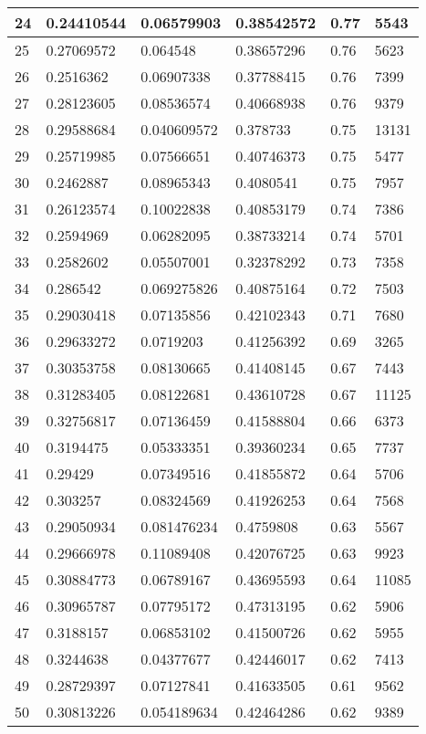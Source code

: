\begin{longtable}{|l|l|l|l|l|l|}
24 & 0.24410544 & 0.06579903 & 0.38542572 & 0.77 & 5543 \\ \hline 
25 & 0.27069572 & 0.064548 & 0.38657296 & 0.76 & 5623 \\ \hline 
26 & 0.2516362 & 0.06907338 & 0.37788415 & 0.76 & 7399 \\ \hline 
27 & 0.28123605 & 0.08536574 & 0.40668938 & 0.76 & 9379 \\ \hline 
28 & 0.29588684 & 0.040609572 & 0.378733 & 0.75 & 13131 \\ \hline 
29 & 0.25719985 & 0.07566651 & 0.40746373 & 0.75 & 5477 \\ \hline 
30 & 0.2462887 & 0.08965343 & 0.4080541 & 0.75 & 7957 \\ \hline 
31 & 0.26123574 & 0.10022838 & 0.40853179 & 0.74 & 7386 \\ \hline 
32 & 0.2594969 & 0.06282095 & 0.38733214 & 0.74 & 5701 \\ \hline 
33 & 0.2582602 & 0.05507001 & 0.32378292 & 0.73 & 7358 \\ \hline 
34 & 0.286542 & 0.069275826 & 0.40875164 & 0.72 & 7503 \\ \hline 
35 & 0.29030418 & 0.07135856 & 0.42102343 & 0.71 & 7680 \\ \hline 
36 & 0.29633272 & 0.0719203 & 0.41256392 & 0.69 & 3265 \\ \hline 
37 & 0.30353758 & 0.08130665 & 0.41408145 & 0.67 & 7443 \\ \hline 
38 & 0.31283405 & 0.08122681 & 0.43610728 & 0.67 & 11125 \\ \hline 
39 & 0.32756817 & 0.07136459 & 0.41588804 & 0.66 & 6373 \\ \hline 
40 & 0.3194475 & 0.05333351 & 0.39360234 & 0.65 & 7737 \\ \hline 
41 & 0.29429 & 0.07349516 & 0.41855872 & 0.64 & 5706 \\ \hline 
42 & 0.303257 & 0.08324569 & 0.41926253 & 0.64 & 7568 \\ \hline 
43 & 0.29050934 & 0.081476234 & 0.4759808 & 0.63 & 5567 \\ \hline 
44 & 0.29666978 & 0.11089408 & 0.42076725 & 0.63 & 9923 \\ \hline 
45 & 0.30884773 & 0.06789167 & 0.43695593 & 0.64 & 11085 \\ \hline 
46 & 0.30965787 & 0.07795172 & 0.47313195 & 0.62 & 5906 \\ \hline 
47 & 0.3188157 & 0.06853102 & 0.41500726 & 0.62 & 5955 \\ \hline 
48 & 0.3244638 & 0.04377677 & 0.42446017 & 0.62 & 7413 \\ \hline 
49 & 0.28729397 & 0.07127841 & 0.41633505 & 0.61 & 9562 \\ \hline 
50 & 0.30813226 & 0.054189634 & 0.42464286 & 0.62 & 9389 \\ \hline 
\end{longtable}